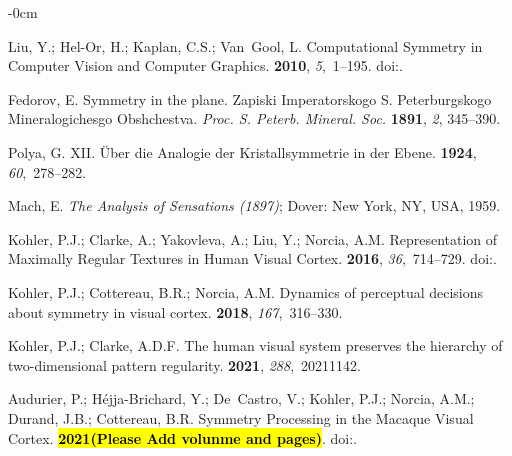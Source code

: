 \documentclass[symmetry,article,accept,pdftex,moreauthors]{Definitions/mdpi}
\begin{document}
\begin{adjustwidth}{-\extralength}{0cm}

\begin{thebibliography}{999}

Liu, Y.; Hel-Or, H.; Kaplan, C.S.; Van~Gool, L.
\newblock Computational Symmetry in Computer Vision and Computer Graphics.
 {\bf
  2010}, {\em 5},~1--195.
\newblock
  doi:{\href{https://doi.org/10.1561/0600000008}{}}.

Fedorov, E.
\newblock Symmetry in the plane.
\newblock  Zapiski Imperatorskogo S. Peterburgskogo Mineralogichesgo
  Obshchestva. \emph{Proc. S. Peterb. Mineral. Soc.}  \textbf{1891}, \emph{2},  345--390.

Polya, G.
\newblock XII. Über die Analogie der Kristallsymmetrie in der Ebene.
 {\bf
  1924}, {\em 60},~278--282.

Mach, E.
\newblock \emph{The {Analysis} of {Sensations} (1897)};
\newblock   Dover: New York, NY, USA,  1959.

Kohler, P.J.; Clarke, A.; Yakovleva, A.; Liu, Y.; Norcia, A.M.
\newblock Representation of Maximally Regular Textures in Human Visual Cortex.
 {\bf 2016}, {\em 36},~714--729.
\newblock
  doi:{\href{https://doi.org/10.1523/jneurosci.2962-15.2016}{}}.

Kohler, P.J.; Cottereau, B.R.; Norcia, A.M.
\newblock Dynamics of perceptual decisions about symmetry in visual cortex.
 {\bf 2018}, {\em 167},~316--330.


Kohler, P.J.; Clarke, A.D.F.
\newblock The human visual system preserves the hierarchy of two-dimensional
  pattern regularity.
 {\bf
  2021}, {\em 288},~20211142.


Audurier, P.; Héjja-Brichard, Y.; De~Castro, V.; Kohler, P.J.; Norcia, A.M.;
  Durand, J.B.; Cottereau, B.R.
\newblock Symmetry {Processing} in the {Macaque} {Visual} {Cortex}.
 {\bf \hl{2021(Please Add volunme and pages)}}.%
\newblock
  doi:{\href{https://doi.org/10.1093/cercor/bhab358}{}}.


\end{thebibliography}
\end{adjustwidth}
\end{document}
